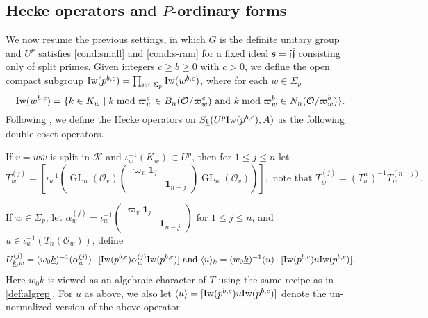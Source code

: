 \documentclass[leqno]{amsart}
\theoremstyle{definition}
\theoremstyle{remark}
\newcommand{\id}{\mathbf{1}}
\newcommand{\oo}{\mathcal{O}}
\DeclareMathOperator{\GL}{GL}
\newcommand{\ff}{\mathfrak{f}}
\newcommand{\fs}{\mathfrak{s}}
\newcommand{\K}{{\mathcal{K}}} %
\newcommand{\bw}{\overline{w}}
\newcommand{\wt}[1]{\underline{ #1 }}
\newcommand{\Iw}{\textnormal{Iw}} %
\begin{document}
\subsection{Hecke operators and $P$-ordinary forms}

We now resume the previous settings,
in which $G$ is the definite unitary group
and $U^p$ satisfies \eqref{cond:small} and \eqref{cond:s-ram}
for a fixed ideal $\fs=\ff\bar{\ff}$ consisting only of split primes.
Given integers $c\geq b\geq 0$ with  $c>0$, 
we define 
the open compact subgroup 
$\Iw(p^{b,c})=\prod_{w\in \Sigma_p}\Iw(w^{b,c})$, where 
for each $w\in \Sigma_p$
\begin{equation}\label{def:Iwahori}
	\Iw(w^{b,c})=\{
	k\in K_w\mid 
    k \bmod \varpi_w^c \in B_n(\oo/\varpi_w^c)
	\text{ and }
	k \bmod \varpi_w^b \in N_n(\oo/\varpi_w^b)
	\}.
\end{equation}
Following \cite{ger}, we define 
the Hecke operators on $S_{\wt{k}}(U^p\Iw(p^{b,c}),A)$
as the following double-coset operators.

If $v=w\bw$ is split in  $\K$ and $\iota_w^{-1}(K_w)\subset U^p$, then
for $1\leq j\leq n$ let 
\begin{equation}\label{def:hecke_away_p}
	T_w^{(j)}=
	\left[\iota_w^{-1}\left(
	\GL_n(\oo_v)
	\begin{pmatrix}
		\varpi_v\id_{j}&\\&\id_{n-j}
	\end{pmatrix}
	\GL_n(\oo_v)
	\right)\right],
	\text{ note that }
	T_{\bw}^{(j)}=(T_{w}^{{n}})^{-1}T_w^{(n-j)}.
\end{equation}

If $w\in \Sigma_p$, let  
$\alpha_w^{(j)}=\iota_w^{-1}
\left(\begin{smallmatrix}
\varpi_v\id_{j}&\\&\id_{n-j} 
\end{smallmatrix}\right)$ for $1\leq j\leq n$,
and $u\in \iota_w^{-1}(T_n(\oo_w))$, define
\begin{equation}\label{def:hecke_at_p}
	U_{\wt{k},w}^{(j)}=
	(w_0\wt{k})^{-1}(\alpha_{w}^{(j)})\cdot
	[\Iw(p^{b,c})\alpha_w^{(j)}\Iw(p^{b,c})]
	\text{ and }
	\langle u\rangle_{\wt{k}}= (w_0\wt{k})^{-1}(u)\cdot 
	[\Iw(p^{b,c})u\Iw(p^{b,c})].
\end{equation}
Here $w_0\wt{k}$ is viewed as an algebraic character of $T$ 
using the same recipe as in \eqref{def:algrep}.
For $u$ as above,
we also let $\langle u\rangle=[\Iw(p^{b,c})u\Iw(p^{b,c})]$
denote the un-normalized version of the above operator.
\end{document}

